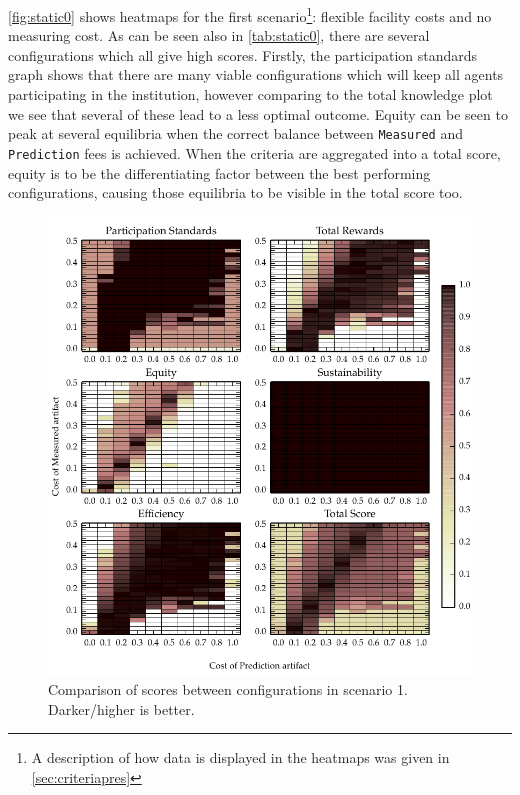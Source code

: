 \autoref{fig:static0} shows heatmaps for the first scenario\footnote{A description of how data is displayed in the heatmaps was given in \autoref{sec:criteriapres}}: flexible
facility costs and no measuring cost. As can be seen also in
\autoref{tab:static0}, there are several configurations which all give high
scores. Firstly, the participation standards graph shows that there are many
viable configurations which will keep all agents participating in the
institution, however comparing to the total knowledge plot we see that several of
these lead to a less optimal outcome. Equity can be seen to peak at several
equilibria when the correct balance between \texttt{Measured} and
\texttt{Prediction} fees is achieved. When the criteria are aggregated into a
total score, equity is to be the differentiating factor between the best
performing configurations, causing those equilibria to be visible in the total
score too.

\begin{figure}
\includegraphics{gfx/kc/static_0.pdf} 
\caption[Comparison of scores between configurations in scenario 1.]{Comparison of scores between configurations in scenario 1. Darker/higher is better.}\label{fig:static0}
\end{figure}

